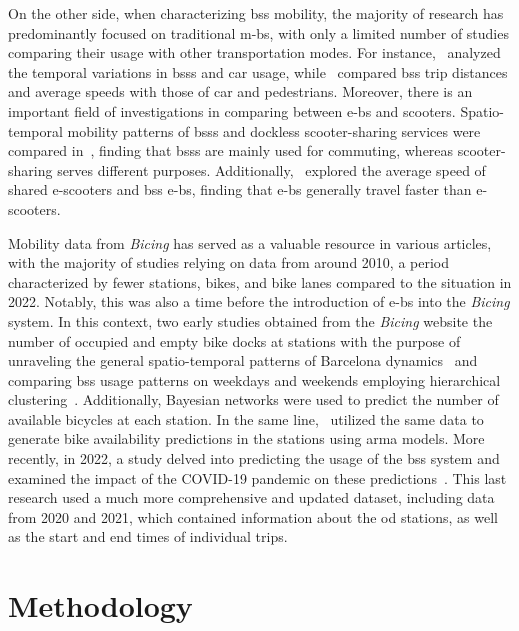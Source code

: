 On the other side, when characterizing \ac{bss} mobility, the majority of research has predominantly focused on traditional \acp{m-b}, with only a limited number of studies comparing their usage with other transportation modes. For instance,~\cite{Noussan2019} analyzed the temporal variations in \acp{bss} and car usage, while~\cite{Jensen2010} compared \ac{bss} trip distances and average speeds with those of car and pedestrians. Moreover, there is an important field of investigations in comparing between \acp{e-b} and scooters. Spatio-temporal mobility patterns of \acp{bss} and dockless scooter-sharing services were compared in~\cite{Mckenzie2019}, finding that \acp{bss} are mainly used for commuting, whereas scooter-sharing serves different purposes. Additionally,~\cite{Almannaa2020} explored the average speed of shared e-scooters and \ac{bss} \acp{e-b}, finding that \acp{e-b} generally travel faster than e-scooters.

Mobility data from \textit{Bicing} has served as a valuable resource in various articles, with the majority of studies relying on data from around 2010, a period characterized by fewer stations, bikes, and bike lanes compared to the situation in 2022. Notably, this was also a time before the introduction of \acp{e-b} into the \textit{Bicing} system. In this context, two early studies obtained from the \textit{Bicing} website the number of occupied and empty bike docks at stations with the purpose of unraveling the general spatio-temporal patterns of Barcelona dynamics~\cite{Froehlich2008} and comparing \ac{bss} usage patterns on weekdays and weekends employing hierarchical clustering~\cite{Froehlich2009}. Additionally, Bayesian networks were used to predict the number of available bicycles at each station. In the same line,~\cite{Kaltenbrunner2010} utilized the same data to generate bike availability predictions in the stations using \ac{arma} models. More recently, in 2022, a study delved into predicting the usage of the \ac{bss} system and examined the impact of the COVID-19 pandemic on these predictions~\cite{Bustamante2022}. This last research used a much more comprehensive and updated dataset, including data from 2020 and 2021, which contained information about the \ac{od} stations, as well as the start and end times of individual trips.



\section{Methodology}

